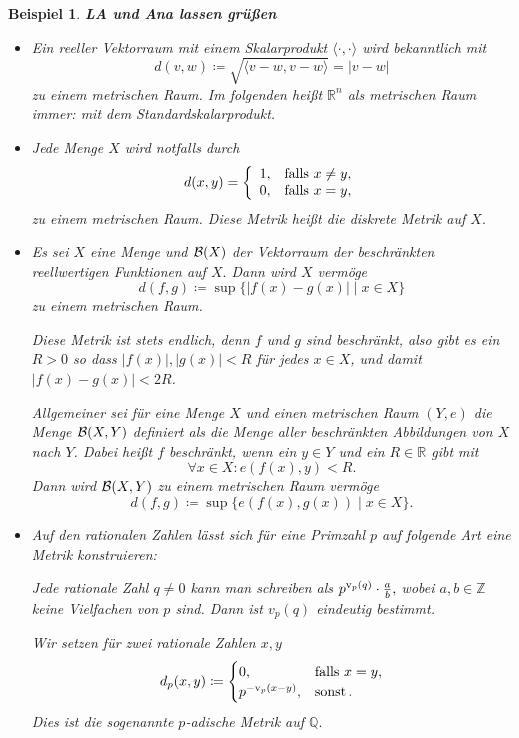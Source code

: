 \documentclass[12pt]{scrbook}   %
\newtheorem{bspX}[alles]{Beispiel}
\newenvironment{bsp}[1]{\begin{bspX}{\bf #1}\par\rm}{\end{bspX}}
\newcommand{\da}{\coloneqq}
\begin{document}
\begin{bsp}{\bf LA und Ana lassen grüßen} \label{L_unendlich}

{\rm 
\begin{itemize}
\item [a)] Ein reeller Vektorraum mit einem Skalarprodukt 
$\langle\cdot,\cdot\rangle$ wird bekanntlich mit 
$$d(v,w) \da \sqrt{\langle v-w,v-w\rangle} = |v-w|$$
zu einem metrischen Raum. Im folgenden heißt $\mathbb R^n$ als metrischen Raum immer: mit dem Standardskalarprodukt.
\item[b)] Jede Menge $X$ wird notfalls durch 
$$d(x,y) = \left\{\begin{array}{rl} 1, & {\rm falls}\ x\neq y,\\
                                    0, & {\rm falls}\ x=y,\\
\end{array}\right.$$
zu einem metrischen Raum. Diese Metrik heißt die {\it diskrete Metrik}
 auf $X.$
\item[c)] Es sei $X$ eine Menge und ${\cal B}(X)$ der Vektorraum der 
beschränkten reellwertigen Funktionen auf $X.$ Dann wird $X$ vermöge
$$d(f,g) \da \sup\{|f(x)-g(x)|\mid x\in X\}$$
zu einem metrischen Raum. 

Diese Metrik ist stets endlich, denn $f$ und $g$ sind beschränkt, also gibt es ein $R>0$ so dass $|f(x)|,|g(x)|<R$ für jedes $x\in X$, und damit $|f(x) - g(x)|<2R$.


Allgemeiner sei für eine Menge $X$ und einen metrischen Raum $(Y,e)$ die 
Menge
${\cal B}(X,Y)$ definiert als die Menge aller beschränkten Abbildungen von 
$X$ nach $Y$. Dabei heißt $f$ beschränkt, wenn ein $y \in Y$ und ein $R\in \mathbb R$ gibt mit
$$\forall x\in X: e(f(x),y) < R.$$
Dann wird ${\cal B}(X,Y)$ zu einem metrischen Raum vermöge
$$d(f,g) \da \sup\{e(f(x),g(x))\mid x\in X\}.$$
\item[d)] Auf den rationalen Zahlen lässt sich für eine Primzahl $p$
auf folgende Art eine Metrik konstruieren:

Jede rationale Zahl $q\neq 0$ kann man schreiben als 
$p^{{\rm v}_p(q)} \cdot \frac ab,$ wobei $a,b\in \mathbb Z$ keine Vielfachen von 
$p$ sind. Dann ist $v_p(q)$ eindeutig bestimmt.

Wir setzen für zwei rationale Zahlen $x,y$
$$d_p(x,y) \da
\begin{cases}
0, & \text{falls }x=y,\\
p^{-{\rm v}_p(x-y)}, & \text{sonst}\,.\end{cases}$$
Dies ist die sogenannte $p$-adische Metrik auf $\mathbb Q.$
\end{itemize}
}\end{bsp}
\end{document}
